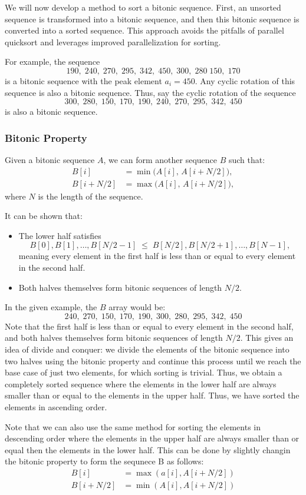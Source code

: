 \documentclass[12pt]{book}
\begin{document}
We will now develop a method to sort a bitonic sequence. First, an unsorted sequence is transformed into a bitonic sequence, and then this bitonic sequence is converted into a sorted sequence. This approach avoids the pitfalls of parallel quicksort and leverages improved parallelization for sorting.

For example, the sequence
\[
190,\;240,\;270,\;295,\;342,\;450,\;300,\;280\;150,\;170
\]
is a bitonic sequence with the peak element $a_i = 450$. Any cyclic rotation of this sequence is also a bitonic sequence. Thus, say the cyclic rotation of the sequence
\[
300,\;280,\;150,\;170,\;190,\;240,\;270,\;295,\;342,\;450
\]
is also a bitonic sequence.

\subsubsection{Bitonic Property}
Given a bitonic sequence $A$, we can form another sequence $B$ such that:
\begin{align*}
    B[i] &= \min\big(A[i],\, A[i+N/2]\big), \\
    B[i+N/2] &= \max\big(A[i],\, A[i+N/2]\big),
\end{align*}
where $N$ is the length of the sequence.

It can be shown that:
\begin{itemize}
    \item The lower half satisfies
    \[
    B[0], B[1], \ldots, B[N/2 - 1] \;\leq\; B[N/2], B[N/2+1], \ldots, B[N-1],
    \]
    meaning every element in the first half is less than or equal to every element in the second half.
    \item Both halves themselves form bitonic sequences of length $N/2$.
\end{itemize}
In the given example, the $B$ array would be:
\[
240,\;270,\;150,\;170,\;190,\;300,\;280,\;295,\;342,\;450
\]
Note that the first half is less than or equal to every element in the second half, and both halves themselves form bitonic sequences of length $N/2$. This gives an idea of divide and conquer: we divide the elements of the bitonic sequence into two halves using the bitonic property and continue this process until we reach the base case of just two elements, for which sorting is trivial. Thus, we obtain a completely sorted sequence where the elements in the lower half are always smaller than or equal to the elements in the upper half. Thus, we have sorted the elements in ascending order.

Note that we can also use the same method for sorting the elements in descending order where the elements in the upper half are always smaller than or equal then the elements in the lower half. This can be done by slightly changin the bitonic property to form the sequnece B as follows:
\begin{align*}
    B[i] &= \max (a[i],A[i+N/2])\\
    B[i+N/2] &= \min(A[i],A[i+N/2])
\end{align*}
\end{document}
